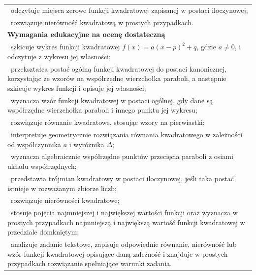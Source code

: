\documentclass[12pt,a4paper]{article}
\begin{document}
\begin{longtable}{|p{16cm}|}
		\textbullet\ odczytuje miejsca zerowe funkcji kwadratowej zapisanej w postaci iloczynowej; \\
		
		\textbullet\ rozwiązuje nierówność kwadratową w prostych przypadkach. \\ \hline
		
		\textbf{Wymagania edukacyjne na ocenę dostateczną} \\ \hline
		
		\textbullet\ szkicuje wykres funkcji kwadratowej $f(x)=a(x-p)^2+q$, gdzie $a\neq 0$, i odczytuje z wykresu jej własności; \\
		
		\textbullet\ przekształca postać ogólną funkcji kwadratowej do postaci kanonicznej, korzystając ze wzorów na współrzędne wierzchołka paraboli, a następnie szkicuje wykres funkcji i opisuje jej własności; \\
		
		\textbullet\ wyznacza wzór funkcji kwadratowej w postaci ogólnej, gdy dane są współrzędne wierzchołka paraboli i innego punktu jej wykresu; \\
		
		\textbullet\ rozwiązuje równanie kwadratowe, stosując wzory na pierwiastki; \\
		
		\textbullet\ interpretuje geometrycznie rozwiązania równania kwadratowego w zależności od współczynnika $a$ i wyróżnika $\Delta$; \\
		
		\textbullet\ wyznacza algebraicznie współrzędne punktów przecięcia paraboli z osiami układu współrzędnych; \\
		
		\textbullet\ przedstawia trójmian kwadratowy w postaci iloczynowej, jeśli taka postać istnieje w rozważanym zbiorze liczb; \\
		
		\textbullet\ rozwiązuje nierówności kwadratowe; \\
		
		\textbullet\ stosuje pojęcia najmniejszej i największej wartości funkcji oraz wyznacza w prostych przypadkach najmniejszą i największą wartość funkcji kwadratowej w przedziale domkniętym; \\
		
		\textbullet\ analizuje zadanie tekstowe, zapisuje odpowiednie równanie, nierówność lub wzór funkcji kwadratowej opisujące daną zależność i znajduje w prostych przypadkach rozwiązanie spełniające warunki zadania. \\ \hline
		

\end{longtable}
\end{document}
